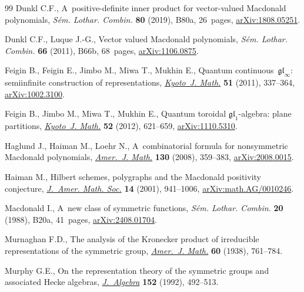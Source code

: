\documentclass[10pt,a4paper]{amsart}
\numberwithin{equation}{section}
\theoremstyle{definition}
\begin{document}
\begin{thebibliography}{99}
Dunkl C.F., A~positive-definite inner product for vector-valued {M}acdonald
 polynomials, \textit{S\'em. Lothar. Combin.} \textbf{80} (2019), B80a,
 26~pages, \href{http://arxiv.org/abs/1808.05251}{arXiv:1808.05251}.

Dunkl C.F., Luque J.-G., Vector valued {M}acdonald polynomials, \textit{S\'em.
 Lothar. Combin.} \textbf{66} (2011), B66b, 68~pages,
 \href{http://arxiv.org/abs/1106.0875}{arXiv:1106.0875}.

Feigin B., Feigin E., Jimbo M., Miwa T., Mukhin E., Quantum
 continuous~{$\mathfrak{gl}_\infty$}: semiinfinite construction of
 representations,
 \href{https://doi.org/10.1215/21562261-1214375}{\textit{Kyoto~J. Math.}}
 \textbf{51} (2011), 337--364,
 \href{http://arxiv.org/abs/1002.3100}{arXiv:1002.3100}.

Feigin B., Jimbo M., Miwa T., Mukhin E., Quantum toroidal
 {$\mathfrak{gl}_1$}-algebra: plane partitions,
 \href{https://doi.org/10.1215/21562261-1625217}{\textit{Kyoto~J. Math.}}
 \textbf{52} (2012), 621--659,
 \href{http://arxiv.org/abs/1110.5310}{arXiv:1110.5310}.

Haglund J., Haiman M., Loehr N., A~combinatorial formula for nonsymmetric
 {M}acdonald polynomials,
 \href{https://doi.org/10.1353/ajm.2008.0015}{\textit{Amer.~J. Math.}}
 \textbf{130} (2008), 359--383,
 \href{http://arxiv.org/abs/2008.0015}{arXiv:2008.0015}.

Haiman M., Hilbert schemes, polygraphs and the {M}acdonald positivity
 conjecture,
 \href{https://doi.org/10.1090/S0894-0347-01-00373-3}{\textit{J.~Amer. Math.
 Soc.}} \textbf{14} (2001), 941--1006,
 \href{http://arxiv.org/abs/math.AG/0010246}{arXiv:math.AG/0010246}.

Macdonald I., A~new class of symmetric functions, \textit{S\'em. Lothar.
 Combin.} \textbf{20} (1988), B20a, 41~pages,
 \href{http://arxiv.org/abs/2408.01704}{arXiv:2408.01704}.

Murnaghan F.D., The analysis of the {K}ronecker product of irreducible
 representations of the symmetric group,
 \href{https://doi.org/10.2307/2371610}{\textit{Amer.~J. Math.}} \textbf{60}
 (1938), 761--784.

Murphy G.E., On the representation theory of the symmetric groups and
 associated {H}ecke algebras,
 \href{https://doi.org/10.1016/0021-8693(92)90045-N}{\textit{J.~Algebra}}
 \textbf{152} (1992), 492--513.


\end{thebibliography}
\end{document}
